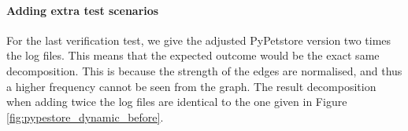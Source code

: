 \paragraph{Adding extra test scenarios}
For the last verification test, we give the adjusted PyPetstore version two times the log files. This means that the expected outcome would be the exact same decomposition. This is because the strength of the edges are normalised, and thus a higher frequency cannot be seen from the graph. The result decomposition when adding twice the log files are identical to the one given in Figure \ref{fig:pypestore_dynamic_before}.


